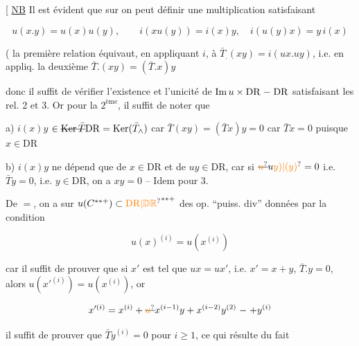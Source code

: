 [ \uline{NB} Il est évident que sur  on peut définir  une multiplication   satisfaisant

\[
u(x.y)=u(x)u(y),\qquad i(xu(y))=i(x)y,\quad i(u(y)x)=y\,i(x)
\]

( la première relation équivaut, en appliquant $i$, à $\bar T_.(xy)=i(ux.uy)$, i.e. en appliq. la deuxième $\bar T.(xy)=(\bar T.x)y$

donc il suffit de vérifier l'existence et l'unicité de $\operatorname{Im}u\times\mathrm{DR}\relbar\mathrm{DR}$  satisfaisant les rel. 2 et 3. Or pour la $2^{\mathrm{ème}}$, il suffit de noter que

a) $i(x)y$ $\in\deleted{\operatorname{Ker}\bar T}\mathrm{DR}=\operatorname{Ker}(\bar T_\wedge)$ car $\bar T(xy)=(\bar T x)y=0$ car $\bar T x=0$ puisque $x\in\mathrm{DR}$

b) $i(x)y$ ne dépend que de $x\in\mathrm{DR}$ et de $uy\in\mathrm{DR}$, car si $\deleted{\unsure{u}}u\unsure{y)|(y)}=0$ i.e. $\bar Ty=0$, i.e. $y\in\mathrm{DR}$, on a $xy=0$ -- Idem pour 3.


De $=$, on a sur $u(C^{**+})\subset\unsure{\mathrm{DR}|\mathbb D\mathbb R}^{**+}$ des op. ``puiss. div''  données par la condition

\[
u(x)^{(i)}=u(x^{(i)})
\]

car il suffit de prouver que si $x'$ est tel que $ux=ux'$, i.e. $x'=x+y$, $\bar T.y=0$, alors $u(x'^{(i)})=u(x^{(i)})$,  or

\[
x'^{(i)}=x^{(i)}+\deleted{\unsure{u}}x^{(i-1)}y+x^{(i-2)}y^{(2)}\mathrel{\relbar}+y^{(i)}
\]

il suffit de prouver que $\bar T y^{(i)}=0$ pour $i\geq1$, ce qui résulte du fait  

